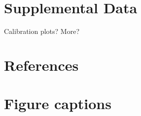 \documentclass[utf8]{frontiersSCNS} %
\begin{document}
\section*{Supplemental Data}
%
%

Calibration plots? More?

\section*{References}



\section*{Figure captions}


%
%
\end{document}
